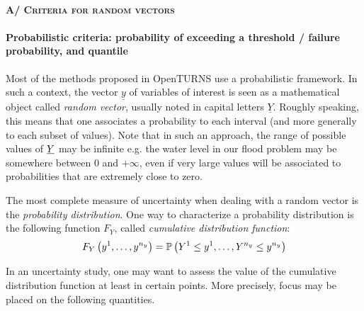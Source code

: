 \paragraph{\textsc{A/ Criteria for random vectors}}
\par


\paragraph{Probabilistic criteria: probability of exceeding a threshold / failure probability, and quantile}
\par

Most of the methods proposed in OpenTURNS use a probabilistic framework. In such a context, the vector $\underline{y}$ of variables of interest is seen as a mathematical object called {\em random vector}, usually noted in capital letters $\underline{Y}$. Roughly speaking, this means that one associates a probability to each interval (and more generally to each subset of values). Note that in such an approach, the range of possible values of ${\underline{Y}}$ may be infinite e.g. the water level in our flood problem may be somewhere between 0 and $+\infty$, even if very large values will be associated to probabilities that are extremely close to zero.

The most complete measure of uncertainty when dealing with a random vector is the {\em probability distribution}. One way to characterize a probability distribution is the following function $F_Y$, called {\em cumulative distribution function}:
\begin{align*}
  F_Y \left( y^1,\ldots,y^{n_y} \right) = {\mathbb P}\left( Y^1 \leq y^1,\ldots, Y^{n_y} \leq y^{n_y} \right)
\end{align*}

In an uncertainty study, one may want to assess the value of the cumulative distribution function at least in certain points. More precisely, focus may be placed on the following quantities.

